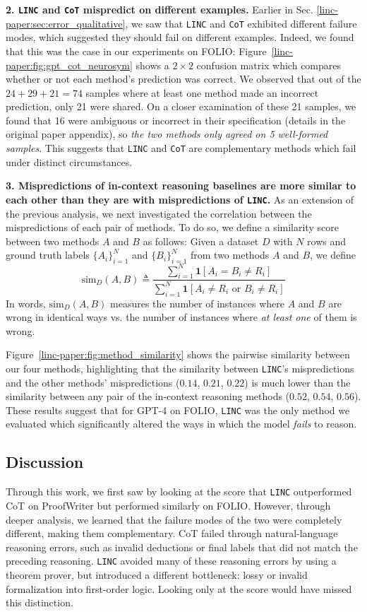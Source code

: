 \textbf{2. \texttt{LINC} and \texttt{CoT} mispredict on different examples.} Earlier in Sec. \ref{linc-paper:sec:error_qualitative}, we saw that \texttt{LINC} and \texttt{CoT} exhibited different failure modes, which suggested they should fail on different examples. Indeed, we found that this was the case in our experiments on FOLIO:
Figure~\ref{linc-paper:fig:gpt_cot_neurosym} shows a $2\times2$ confusion matrix which compares whether or not each method's prediction was correct.
We observed that out of the $24+29+21=74$ samples where at least one method made an incorrect prediction, only 21 were shared.
On a closer examination of these 21 samples, we found that 16 were ambiguous or incorrect in their specification (details in the original paper appendix), so \textit{the two methods only agreed on 5 well-formed samples}.
This suggests that \texttt{LINC} and \texttt{CoT} are complementary methods which fail under distinct circumstances.

\textbf{3. Mispredictions of in-context reasoning baselines are more similar to each other than they are with mispredictions of \texttt{LINC}.} As an extension of the previous analysis, we next investigated the correlation between the mispredictions of each pair of methods.
To do so, we define a similarity score between two methods $A$ and $B$ as follows:
Given a dataset $D$ with $N$ rows and ground truth labels $\{A_i\}_{i=1}^N$ and $\{B_i\}_{i=1}^N$ from two methods $A$ and $B$, we define
$$\text{sim}_D(A, B) \triangleq \frac{\sum_{i=1}^N \mathbf{1}\left[ A_i = B_i \ne R_i \right] }{\sum_{i=1}^N \mathbf{1}\left[ A_i \ne R_i \text{ or } B_i \ne R_i\right]}$$
In words, $\text{sim}_D(A,B)$ measures the number of instances where $A$ and $B$ are wrong in identical ways vs. the number of instances where \emph{at least one} of them is wrong.

Figure~\ref{linc-paper:fig:method_similarity} shows the pairwise similarity between our four methods, highlighting that the similarity between \texttt{LINC}'s mispredictions and the other methods' mispredictions ($0.14$, $0.21$, $0.22$) is much lower than the similarity between any pair of the in-context reasoning methods ($0.52$, $0.54$, $0.56$).
These results suggest that for GPT-4 on FOLIO, \texttt{LINC} was the only method we evaluated which significantly altered the ways in which the model \emph{fails} to reason.

\subsection{Discussion}
Through this work, we first saw by looking at the score that \texttt{LINC} outperformed CoT on
ProofWriter but performed similarly on FOLIO. However, through deeper analysis, we learned that
the failure modes of the two were completely different, making them complementary. CoT failed through natural-language reasoning errors, such as invalid deductions or final labels that
did not match the preceding reasoning. \texttt{LINC} avoided many of these reasoning errors by using
a theorem prover, but introduced a different bottleneck: lossy or invalid formalization into first-order
logic. Looking only at the score would have missed this distinction.
